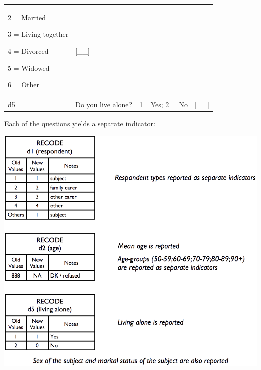 \documentclass[12pt,a4paper]{book}
\theoremstyle{definition}
\theoremstyle{definition}
\theoremstyle{definition}
\theoremstyle{remark}
\begin{document}
\begin{longtable}[]{@{}llll@{}}
\begin{minipage}[t]{0.24\columnwidth}
2 = Married

3 = Living together

4 = Divorced

5 = Widowed

6 = Other\strut
\end{minipage} & \begin{minipage}[t]{0.24\columnwidth}\raggedright
{[}\_\_{]}\strut
\end{minipage}\tabularnewline
\begin{minipage}[t]{0.10\columnwidth}\raggedright
d5\strut
\end{minipage} & \begin{minipage}[t]{0.34\columnwidth}\raggedright
Do you live alone?\strut
\end{minipage} & \begin{minipage}[t]{0.29\columnwidth}\raggedright
1= Yes; 2 = No\strut
\end{minipage} & \begin{minipage}[t]{0.15\columnwidth}\raggedright
{[}\_\_{]}\strut
\end{minipage}\tabularnewline
\bottomrule
\end{longtable}

Each of the questions yields a separate indicator:

\begin{center}\includegraphics[width=800pt]{figures/indicators03} \end{center}
\end{document}
